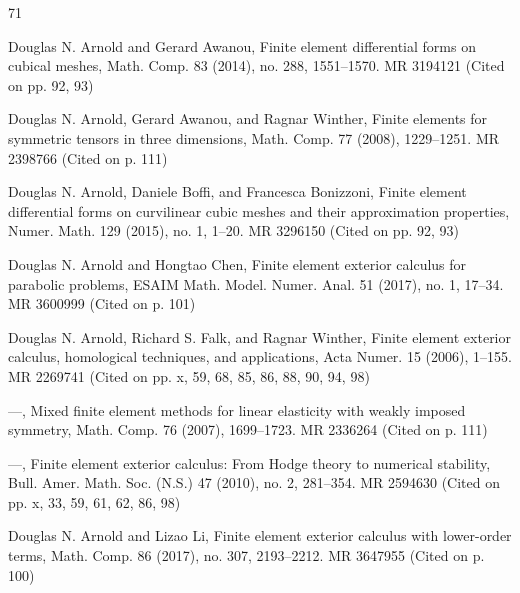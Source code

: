 \begin{MBSourceBibliography}{71}
\item\label{bib:source-7}Douglas N. Arnold and Gerard Awanou, Finite element differential forms on cubical meshes, Math. Comp. 83 (2014), no. 288, 1551–1570. MR 3194121 (Cited on pp. 92, 93)

\item\label{bib:source-8}Douglas N. Arnold, Gerard Awanou, and Ragnar Winther, Finite elements for symmetric tensors in three dimensions, Math. Comp. 77 (2008), 1229–1251. MR 2398766 (Cited on p. 111)

\item\label{bib:source-9}Douglas N. Arnold, Daniele Boffi, and Francesca Bonizzoni, Finite element differential forms on curvilinear cubic meshes and their approximation properties, Numer. Math. 129 (2015), no. 1, 1–20. MR 3296150 (Cited on pp. 92, 93)

\item\label{bib:source-10}Douglas N. Arnold and Hongtao Chen, \newline Finite element exterior calculus for parabolic problems, ESAIM Math. Model. Numer. Anal. 51 (2017), no. 1, 17–34. MR 3600999 (Cited on p. 101)

\item\label{bib:source-11}Douglas N. Arnold, Richard S. Falk, and Ragnar Winther, Finite element exterior calculus, homological techniques, and applications, Acta Numer. 15 (2006), 1–155. MR 2269741 (Cited on pp. x, 59, 68, 85, 86, 88, 90, 94, 98)

\item\label{bib:source-12}—, Mixed finite element methods for linear elasticity with weakly imposed symmetry, Math. Comp. 76 (2007), 1699–1723. MR 2336264 (Cited on p. 111)

\item\label{bib:source-13}—, Finite element exterior calculus: From Hodge theory to numerical stability, Bull. Amer. Math. Soc. (N.S.) 47 (2010), no. 2, 281–354. MR 2594630 (Cited on pp. x, 33, 59, 61, 62, 86, 98)

\item\label{bib:source-14}Douglas N. Arnold and Lizao Li, Finite element exterior calculus with lower-order terms, Math. Comp. 86 (2017), no. 307, 2193–2212. MR 3647955 (Cited on p. 100)


\end{MBSourceBibliography}
